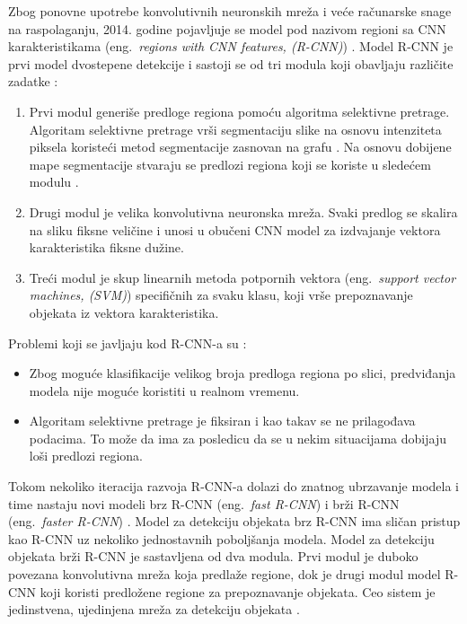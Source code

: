 \documentclass[12pt,oneside]{memoir}
\begin{document}
Zbog ponovne upotrebe konvolutivnih neuronskih mreža i veće računarske snage na raspolaganju, 2014. godine pojavljuje se model pod nazivom regioni sa CNN karakteristikama (eng.~\textit{regions with CNN features, (R-CNN)}) \cite{girshick2014rich}. 
Model R-CNN je prvi model dvostepene detekcije i sastoji se od tri modula koji obavljaju različite zadatke \cite{girshick2014rich}:
\begin{enumerate}
  \item Prvi modul generiše predloge regiona pomoću algoritma selektivne pretrage. Algoritam selektivne pretrage vrši segmentaciju slike na osnovu intenziteta piksela koristeći metod segmentacije zasnovan na grafu \cite{narayan2008image}. Na osnovu dobijene mape segmentacije stvaraju se predlozi regiona koji se koriste u sledećem modulu \cite{uijlings2013selective}.
  \item Drugi modul je velika konvolutivna neuronska mreža. Svaki predlog se skalira na sliku fiksne veličine i unosi u obučeni CNN model za izdvajanje vektora karakteristika fiksne dužine.
  \item Treći modul je skup linearnih metoda potpornih vektora (eng.~\textit{support vector machines, (SVM)}) specifičnih za svaku klasu, koji vrše prepoznavanje objekata iz vektora karakteristika.
\end{enumerate}


Problemi koji se javljaju kod R-CNN-a su \cite{gandhi_2018}:
\begin{itemize}
    \item Zbog moguće klasifikacije velikog broja predloga regiona po slici, predviđanja modela nije moguće koristiti u realnom vremenu.
    \item Algoritam selektivne pretrage je fiksiran i kao takav se ne prilagođava podacima. To može da ima za posledicu da se u nekim situacijama dobijaju loši predlozi regiona.
\end{itemize}

Tokom nekoliko iteracija razvoja R-CNN-a dolazi do znatnog ubrzavanje modela i time nastaju novi modeli brz R-CNN (eng.~\textit{fast R-CNN}) \cite{girshick2015fast} i brži R-CNN (eng.~\textit{faster R-CNN}) \cite{ren2015faster}.  Model za detekciju objekata brz R-CNN ima sličan pristup kao R-CNN uz nekoliko jednostavnih poboljšanja modela. Model za detekciju objekata brži R-CNN  je sastavljena od dva modula. Prvi modul je duboko povezana konvolutivna mreža koja predlaže regione, dok je drugi modul model R-CNN koji koristi predložene regione za prepoznavanje objekata. Ceo sistem je jedinstvena, ujedinjena mreža za detekciju objekata \cite{ren2015faster}.
\end{document}
